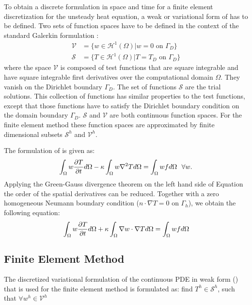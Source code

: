 To obtain a discrete formulation in space and time for a finite element discretization for the unsteady heat equation, a weak or variational form of  has to be defined. Two sets of function spaces have to be defined in the context of the standard Galerkin formulation \cite{doneaFiniteElementMethods2003}:
\begin{align}
	\mathcal{V} &= \{w \in \mathcal{H}^1(\Omega) | w = 0 \text{ on } \Gamma_D\}\\
	\mathcal{S} &= \{T \in \mathcal{H}^1(\Omega) | T = T_D \text{ on } \Gamma_D\}
\end{align}
where the space $\mathcal{V}$ is composed of test functions that are square integrable and have square integrable first derivatives over the computational domain $\Omega$. They vanish on the Dirichlet boundary $\Gamma_D$. The set of functions $\mathcal{S}$ are the trial solutions. This collection of functions has similar properties to the test functions, except that those functions have to satisfy the Dirichlet boundary condition on the domain boundary $\Gamma_D$. $\mathcal{S}$ and $\mathcal{V}$ are both continuous function spaces. For the finite element method these function spaces are approximated by finite dimensional subsets $\mathcal{S}^h$ and $\mathcal{V}^h$.

The formulation of  is given as:
\begin{equation}
	\label{eq:weak}
	\int_{\Omega} w\frac{\partial T}{\partial t} d\Omega - \kappa \int_{\Omega} w \nabla^2 T d\Omega = \int_{\Omega}w f d\Omega \ \ \forall w .
\end{equation}
Applying the Green-Gauss divergence theorem on the left hand side of Equation  the order of the spatial derivatives can be reduced. Together with a zero homogeneous Neumann boundary condition ($n \cdot \nabla T = 0 \text{ on } \Gamma_h$), we obtain the following equation:
\begin{equation}
	\label{eq:weak2}
	\int_{\Omega}w\frac{\partial T}{\partial t} d\Omega + \kappa \int_{\Omega} \nabla w \cdot \nabla T d\Omega = \int_{\Omega} w f d\Omega
\end{equation}

\subsection{Finite Element Method}

The discretized variational formulation of the continuous PDE in weak form ()  that is used for the finite element method is formulated as: find $T^h \in \mathcal{S}^h$, such that $\forall w^h \in \mathcal{V}^h$

